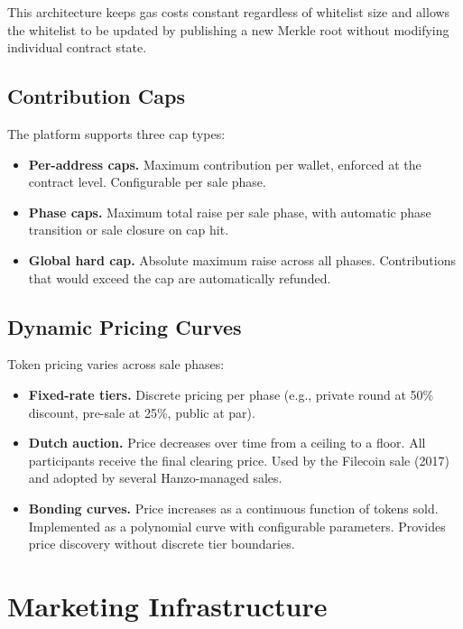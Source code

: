 \documentclass[11pt,letterpaper]{article}
\begin{document}
This architecture keeps gas costs constant regardless of whitelist size and
allows the whitelist to be updated by publishing a new Merkle root without
modifying individual contract state.

\subsection{Contribution Caps}

The platform supports three cap types:

\begin{itemize}[leftmargin=1.2em]
    \item \textbf{Per-address caps.} Maximum contribution per wallet, enforced
    at the contract level. Configurable per sale phase.
    \item \textbf{Phase caps.} Maximum total raise per sale phase, with
    automatic phase transition or sale closure on cap hit.
    \item \textbf{Global hard cap.} Absolute maximum raise across all phases.
    Contributions that would exceed the cap are automatically refunded.
\end{itemize}

\subsection{Dynamic Pricing Curves}

Token pricing varies across sale phases:

\begin{itemize}[leftmargin=1.2em]
    \item \textbf{Fixed-rate tiers.} Discrete pricing per phase (e.g., private
    round at 50\% discount, pre-sale at 25\%, public at par).
    \item \textbf{Dutch auction.} Price decreases over time from a ceiling to a
    floor. All participants receive the final clearing price. Used by the
    Filecoin sale (2017) and adopted by several Hanzo-managed sales.
    \item \textbf{Bonding curves.} Price increases as a continuous function of
    tokens sold. Implemented as a polynomial curve with configurable
    parameters. Provides price discovery without discrete tier boundaries.
\end{itemize}

\section{Marketing Infrastructure}
\label{sec:marketing-infra}
\end{document}

